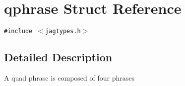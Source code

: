 \hypertarget{structqphrase}{
\section{qphrase Struct Reference}
\label{structqphrase}
}
{\tt \#include $<$jagtypes.h$>$}



\subsection{Detailed Description}
A quad phrase is composed of four phrases 
